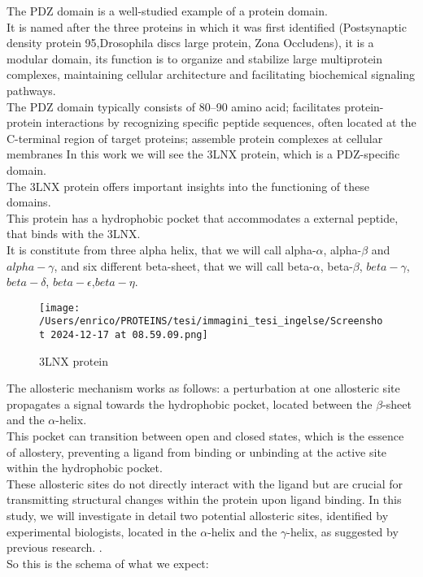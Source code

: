 \documentclass[English, Lau, oneside]{sapthesis}
\begin{document}
The PDZ domain is a well-studied example of a protein domain.\\
It is named after the three proteins in which it was first identified (Postsynaptic density protein 95,Drosophila discs large protein, Zona Occludens), it is a modular domain, its function is to organize and stabilize large multiprotein complexes, maintaining cellular architecture and facilitating biochemical signaling pathways. \cite{ref8}\\
The PDZ domain typically consists of 80--90 amino acid; facilitates protein-protein interactions by recognizing specific peptide sequences, often located at the C-terminal region of target proteins; assemble protein complexes at cellular membranes
In this work we will see the 3LNX protein, which is a PDZ-specific domain.\\
The 3LNX protein offers important insights into the functioning of these domains.\\
This protein has a hydrophobic pocket that accommodates a external peptide, that binds with the 3LNX.\\
It is constitute from three alpha helix, that we will call alpha-$\alpha$, alpha-$\beta$ and $alpha-\gamma$, and six different beta-sheet, that we will call beta-$\alpha$, beta-$\beta$, $beta-\gamma$,$beta-\delta$, $beta-\epsilon$,$beta-\eta$. \\
\begin{figure}[H]
    \centering
    \texttt{[image: /Users/enrico/PROTEINS/tesi/immagini\_tesi\_ingelse/Screenshot 2024-12-17 at 08.59.09.png]}
    \caption{3LNX protein}
\end{figure}
The allosteric mechanism works as follows: a perturbation at one allosteric site propagates a signal towards the hydrophobic pocket, located between the $\beta$-sheet and the $\alpha$-helix. \\
This pocket can transition between open and closed states, which is the essence of allostery, preventing a ligand from binding or unbinding at the active site within the hydrophobic pocket. \\
These allosteric sites do not directly interact with the ligand but are crucial for transmitting structural changes within the protein upon ligand binding. In this study, we will investigate in detail two potential allosteric sites, identified by experimental biologists, located in the $\alpha$-helix and the $\gamma$-helix, as suggested by previous research. \cite{ref15}.\\
So this is the schema of what we expect:
\end{document}
